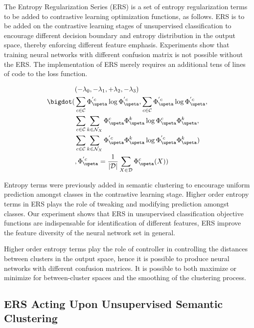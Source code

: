 \documentclass[10pt,twocolumn,letterpaper]{article}
\begin{document}
The Entropy Regularization Series (ERS) is a set of entropy regularization terms to be added to contrastive learning optimization functions, as follows. ERS is to be added on the contrastive learning stages of unsupervised classification to encourage different decision boundary and entropy distribution in the output space, thereby enforcing different feature emphasis. Experiments show that training neural networks with different confusion matrix is not possible without the ERS. The implementation of ERS merely requires an additional tens of lines of code to the loss function. 

\begin{equation}
\begin{aligned}
&(-\lambda_{0}, -\lambda_{1}, +\lambda_{2}, -\lambda_{3}) \\
\bigdot (& \sum_{c \in \mathcal{C}}  \Phi_{\upeta}^{'c} \log  \Phi_{\upeta}^{'c}, \sum_{c \in \mathcal{C}}  \Phi_{\upeta}^{'c} \log  \Phi_{\upeta}^{'c}, \\
& \sum_{c \in \mathcal{C}} \sum_{k \in \mathcal{N}_X} \Phi_{\upeta}^{c} \Phi_{\upeta}^{k} \log  \Phi_{\upeta}^{c}\Phi_{\upeta}^{k},  \\ 
&\sum_{c \in \mathcal{C}}  \sum_{k \in \mathcal{N}_X} \Phi_{\upeta}^{'c} \Phi_{\upeta}^{k} \log  \Phi_{\upeta}^{'c} \Phi_{\upeta}^{k} ) \\
& , \space \Phi_{\upeta}^{'c} = \frac{1}{|\mathcal{D}|} \sum_{X \in \mathcal{D}}  \Phi_{\upeta}^{c} (X))
\end{aligned}
\end{equation}

Entropy terms were previously added in semantic clustering to encourage uniform prediction amongst classes in the contrastive learning stage. Higher order entropy terms in ERS plays the role of tweaking and modifying prediction amongst classes. Our experiment shows that ERS in unsupervised classification objective functions are indispensable for identification of different features, ERS improve the feature diversity of the neural network set in general.

 Higher order entropy terms play the role of controller in controlling the distances between clusters in the output space, hence it is possible to produce neural networks with different confusion matrices. It is possible to both maximize or minimize for between-cluster spaces and the smoothing of the clustering process. 

\subsection{ERS Acting Upon Unsupervised Semantic Clustering}
\end{document}
